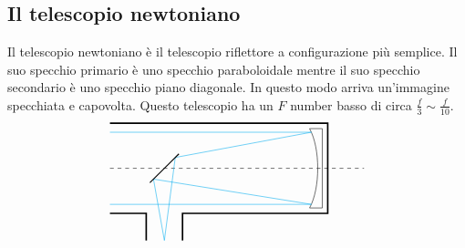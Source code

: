 \documentclass[a4paper, oneside]{book}
\begin{document}
\subsection{Il telescopio newtoniano}
Il telescopio newtoniano è il telescopio riflettore a configurazione più semplice. Il 
suo specchio primario è uno specchio paraboloidale mentre il suo specchio secondario è
uno specchio piano diagonale. In questo modo arriva un'immagine specchiata
e capovolta. Questo telescopio ha un $F$ number basso
di circa $\frac{f}{3} \sim \frac{f}{10} $. 
\begin{gather*}
    \begin{tikzpicture}
        \draw[dashed](0, 0) -- (7, 0);
        \draw[very thick](0, 1.25) -- (6, 1.25) -- (6, -1.25) -- (2, -1.25) -- (2, -2);
        \draw[very thick](0, -1.25) -- (1, -1.25) -- (1, -2);
        \draw(5.5, 1.1) -- (5.85, 1.1) -- (5.85, -1.1) -- (5.5, - 1.1);
        \draw(5.5, -1.1) .. controls (5.8, -0.55) and (5.8, 0.55) .. (5.5, 1.1);
        \draw[cyan](0, 1) -- (5.55, 1) -- (1.8, 0.3) -- (1.5, -2);
        \draw[cyan](0, -1) -- (5.55, -1) -- (1.2, -0.3) -- (1.5, -2);
        \draw[thick] (1.1, -0.4) -- (1.9, 0.4);
    \end{tikzpicture}
\end{gather*}
\end{document}
